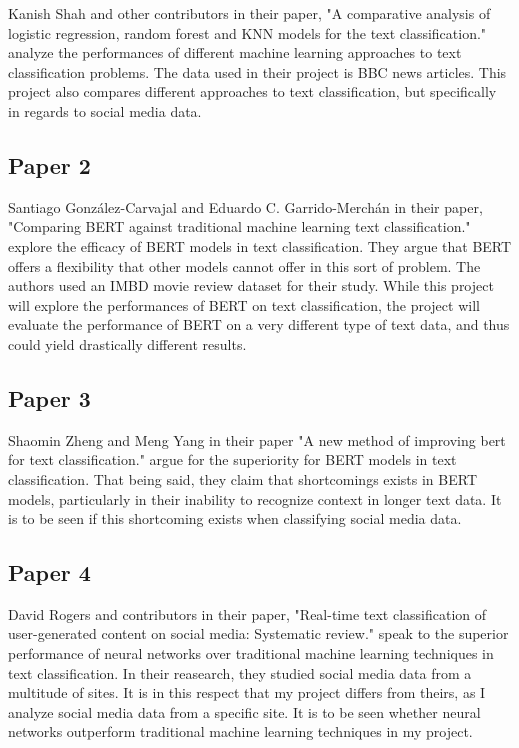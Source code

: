 \documentclass[11pt,a4paper]{article}
\begin{document}
Kanish Shah and other contributors in their paper, "A comparative analysis of logistic regression, random forest and KNN models for the text classification." analyze the performances of different machine learning approaches to text classification problems. The data used in their project is BBC news articles. This project also compares different approaches to text classification, but specifically in regards to social media data.

\subsection{Paper 2}

Santiago González-Carvajal and Eduardo C. Garrido-Merchán in their paper, "Comparing BERT against traditional machine learning text classification." explore the efficacy of BERT models in text classification. They argue that BERT offers a flexibility that other models cannot offer in this sort of problem. The authors used an IMBD movie review dataset for their study. While this project will explore the performances of BERT on text classification, the project will evaluate the performance of BERT on a very different type of text data, and thus could yield drastically different results.

\subsection{Paper 3}

Shaomin Zheng and Meng Yang in their paper "A new method of improving bert for text classification." argue for the superiority for BERT models in text classification. That being said, they claim that shortcomings exists in BERT models, particularly in their inability to recognize context in longer text data. It is to be seen if this shortcoming exists when classifying social media data.

\subsection{Paper 4}

David Rogers and contributors in their paper, "Real-time text classification of user-generated content on social media: Systematic review." speak to the superior performance of neural networks over traditional machine learning techniques in text classification. In their reasearch, they studied social media data from a multitude of sites. It is in this respect that my project differs from theirs, as I analyze social media data from a specific site. It is to be seen whether neural networks outperform traditional machine learning techniques in my project.
\end{document}
